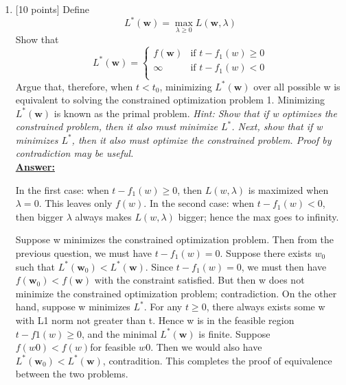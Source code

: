 \documentclass{article}
\renewcommand{\vec}[1]{\boldsymbol{#1}}
\newenvironment{qparts}{\begin{enumerate}[1.]}{\end{enumerate}}
\begin{document}
\begin{qparts}
Based on this discussion, we only need to find solutions for one case of the KKT conditions when $t < t_0$. Which case is this, and why? \\
\underline{\textbf{Answer:}}\\
{\color{blue}
When t < t0, the constraint must be active at any optimum.
This means we must have $t - f_1(w) = 0$.
}

\item {[}10 points{]}
Define
\begin{equation}
L^*(\vec{w})=\max_{\lambda\geq 0}L(\vec{w}, \lambda)
\end{equation}
Show that
\begin{equation}
L^*(\vec{w})=\begin{cases}
f(\vec{w}) & \text{if $t - f_1(w) \geq 0$} \\
\infty & \text{if $t - f_1(w) < 0$} \\
\end{cases}
\end{equation}
Argue that, therefore, when $t < t_0$, minimizing $L^*(\vec{w})$ over all possible w is equivalent to solving the constrained optimization problem 1. Minimizing $L^*(\vec{w})$ is known as the primal problem.
\textit{Hint: Show that if w optimizes the constrained problem, then it also must minimize $L^*$. Next, show that if w minimizes $L^*$, then it also must optimize the constrained problem. Proof by contradiction may be useful.}\\
\underline{\textbf{Answer:}}\\
{\color{blue}
In the first case: when $t - f_1(w) \geq 0$, then $L(w, \lambda)$ is maximized when $\lambda = 0$. This leaves only $f(w)$. In the second case: when $t - f_1(w) < 0$, then bigger $\lambda$ always makes $L(w, \lambda)$ bigger; hence the max goes to infinity.

Suppose w minimizes the constrained optimization problem. Then from the previous question, we must have $t - f_1(w) = 0$. Suppose there exists $w_0$ such that $L^*(\vec{w}_0) < L^*(\vec{w})$. Since $t - f_1(w) = 0$, we must then have $f(\vec{w}_0) < f(\vec{w})$ with the constraint satisfied. But then w does not minimize the constrained optimization problem; contradiction. On the other hand, suppose w minimizes $L^*$. For any $t \geq 0$, there always exists some w with L1 norm not greater than t. Hence w is in the feasible region $t - f1(w) \geq 0$, and the minimal $L^*(\vec{w})$ is finite. Suppose $f(w0) < f(w) $for feasible $w0$. Then we would also have $L^*(\vec{w}_0) < L^*(\vec{w})$, contradition. This completes the proof of equivalence between the two problems.
}


\end{qparts}
\end{document}
